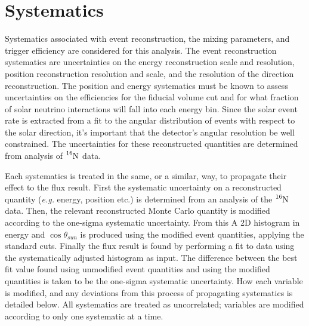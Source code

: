 \section{Systematics}
\label{sec:systematics}
Systematics associated with event reconstruction, the mixing parameters,
and trigger efficiency are considered for this analysis.
The event reconstruction systematics are uncertainties on the energy reconstruction
scale and resolution, position reconstruction resolution and scale, and the
resolution of the direction reconstruction.
The position and energy systematics must be known to assess uncertainties
on the efficiencies for the fiducial volume cut and for what fraction
of solar neutrino interactions will fall into each energy bin.
Since the solar event rate is extracted from a fit to the angular distribution
of events with respect to the solar direction, it's important that the
detector's angular resolution be well constrained.
The uncertainties for these reconstructed quantities are determined from
analysis of $\ce{^{16}N}$ data.

Each systematics is treated in the same, or a similar, way, to propagate
their effect to the flux result.
First the systematic uncertainty on a reconstructed quantity (\textit{e.g.} energy, position etc.)
is determined from an analysis of the $\ce{^{16}N}$ data.
Then, the relevant reconstructed Monte Carlo quantity 
is modified according to the one-sigma systematic uncertainty.
From this A 2D histogram in energy and $\cos\theta_{sun}$ is produced using the
modified event quantities, applying the standard cuts.
Finally the flux result is found by performing a fit to data using the systematically
adjusted histogram as input.
The difference between the best fit value found using unmodified event quantities
and using the modified quantities is taken to be the one-sigma systematic uncertainty.
How each variable is modified, and any deviations from this process of propagating systematics is detailed below.
All systematics are treated as uncorrelated; variables are modified according to
only one systematic at a time.

